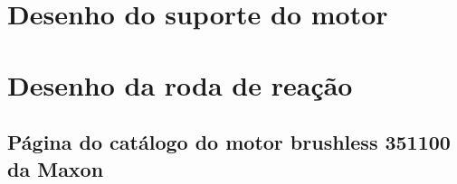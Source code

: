 \documentclass[
	12pt,				%
	openany,			%
	twoside,			%
	a4paper,			%
	english,			%
	french,				%
	spanish,			%
	brazil,				%
	oldfontcommands
	]{abntex2}
\begin{document}
\begin{apendicesenv}
\partapendices
\chapter{Desenho do suporte do motor}



\chapter{Desenho da roda de reação}



\end{apendicesenv}

\begin{anexosenv}
\partanexos
\chapter{Página do catálogo do motor brushless 351100 da Maxon}



\end{anexosenv}
\end{document}
